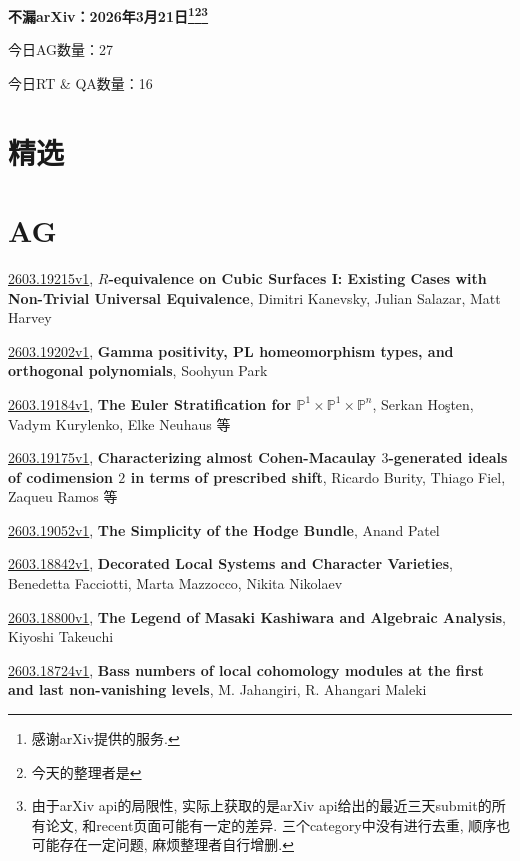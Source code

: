 \documentclass[9pt, a4paper]{article}
\theoremstyle{plain}
\theoremstyle{definition}
\theoremstyle{remark}
\newcommand{\arxiv}[3]{\href{https://arxiv.org/abs/#1}{#1}, \textbf{\textcolor{arxivblue}{#2}}, #3}
\newcommand{\AGnumber}{27}
\newcommand{\RTQAnumber}{16}
\newcommand{\NewestDate}{2026年3月21日}
\newcommand{\todayarXiver}{} %
\begin{document}
\begin{center}
    \Huge\textbf{不漏arXiv：\NewestDate\footnote{感谢arXiv提供的服务.}\footnote{今天的整理者是\todayarXiver}\footnote{由于arXiv api的局限性, 实际上获取的是arXiv api给出的最近三天submit的所有论文, 和recent页面可能有一定的差异. 三个category中没有进行去重, 顺序也可能存在一定问题, 麻烦整理者自行增删.}} \\
\end{center}

\setcounter{section}{-1}

\begin{center}
    今日AG数量：\AGnumber
    
    今日RT \& QA数量：\RTQAnumber
    
\end{center}


\section{精选}


\section{AG}
\arxiv{2603.19215v1}{$R$-equivalence on Cubic Surfaces I: Existing Cases with Non-Trivial Universal Equivalence}{Dimitri Kanevsky, Julian Salazar, Matt Harvey}

\arxiv{2603.19202v1}{Gamma positivity, PL homeomorphism types, and orthogonal polynomials}{Soohyun Park}

\arxiv{2603.19184v1}{The Euler Stratification for $\mathbb{P}^1 \times \mathbb{P}^1 \times \mathbb{P}^n$}{Serkan Hoşten, Vadym Kurylenko, Elke Neuhaus 等}

\arxiv{2603.19175v1}{Characterizing almost Cohen-Macaulay $3$-generated ideals of codimension $2$ in terms of prescribed shift}{Ricardo Burity, Thiago Fiel, Zaqueu Ramos 等}

\arxiv{2603.19052v1}{The Simplicity of the Hodge Bundle}{Anand Patel}

\arxiv{2603.18842v1}{Decorated Local Systems and Character Varieties}{Benedetta Facciotti, Marta Mazzocco, Nikita Nikolaev}

\arxiv{2603.18800v1}{The Legend of Masaki Kashiwara and Algebraic Analysis}{Kiyoshi Takeuchi}

\arxiv{2603.18724v1}{Bass numbers of local cohomology modules at the first and last non-vanishing levels}{M. Jahangiri, R. Ahangari Maleki}
\end{document}
